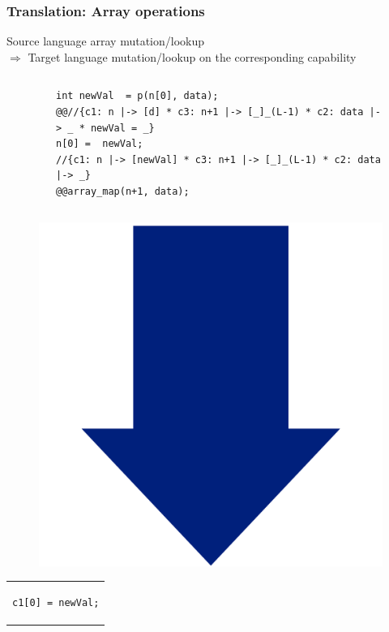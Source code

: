 \documentclass{beamer}
\begin{document}
\begin{frame}[fragile]
\frametitle{Translation: Array operations}
Source language array mutation/lookup\\
$\Rightarrow$ Target language mutation/lookup on the corresponding capability
 \vspace{-1em}

\begin{columns}
\begin{column}{0.1\textwidth}
\end{column}
\begin{column}{0.90\textwidth}
\begin{figure}[h]
  \centering
\begin{lstlisting}[style=CStyleOverlay, captionpos = t, firstnumber = 13]
int newVal  = p(n[0], data);
@@//{c1: n |-> [d] * c3: n+1 |-> [_]_(L-1) * c2: data |-> _ * newVal = _}
n[0] =  newVal;
//{c1: n |-> [newVal] * c3: n+1 |-> [_]_(L-1) * c2: data |-> _}
@@array_map(n+1, data);
\end{lstlisting}
\end{figure}
\end{column}
\end{columns}

\vspace{-.5em}
\begin{figure}[h]
\includegraphics[width=0.07\linewidth]{BlueArrowVertical}
\end{figure}
\vspace{-2em}

\begin{center}
\begin{tabular}{c}
\begin{lstlisting}[style=CStyleNoNum, captionpos = t]
c1[0] = newVal;
\end{lstlisting}
\end{tabular}
\end{center}

\end{frame}
\end{document}
